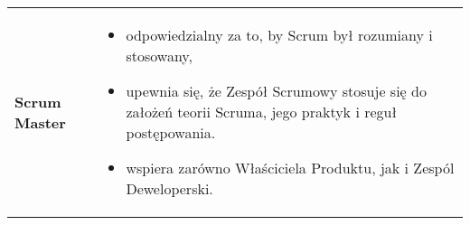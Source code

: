 \documentclass[../main.tex]{subfiles}
\begin{document}
\begin{table}[H]
\begin{center}
\begin{tabular}{ p{} p{} }
                \cmidrule(r){1-1}\cmidrule(l){2-2}
                \textbf{Scrum Master}
                &
                \begin{itemize}
                    \item odpowiedzialny za to, by Scrum był rozumiany i stosowany,
                    \item upewnia się, że Zespół Scrumowy stosuje się do założeń teorii Scruma, jego praktyk i reguł postępowania.
                    \item wspiera zarówno Właściciela Produktu, jak i Zespól Deweloperski.
                \end{itemize}
                \\
            \end{tabular}
        \end{center}
    \end{table}
\end{document}
